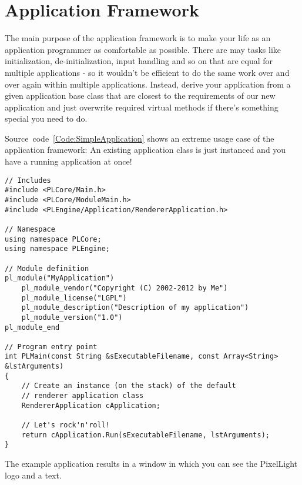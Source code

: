\section{Application Framework}
The main purpose of the application framework is to make your life as an application programmer as comfortable as possible. There are may tasks like initialization, de-initialization, input handling and so on that are equal for multiple applications - so it wouldn't be efficient to do the same work over and over again within multiple applications. Instead, derive your application from a given application base class that are closest to the requirements of our new application and just overwrite required virtual methods if there's something special you need to do.

Source~code~\ref{Code:SimpleApplication} shows an extreme usage case of the application framework: An existing application class is just instanced and you have a running application at once!
\begin{lstlisting}[label=Code:SimpleApplication,caption={Simple application using the application framework}]
// Includes
#include <PLCore/Main.h>
#include <PLCore/ModuleMain.h>
#include <PLEngine/Application/RendererApplication.h>

// Namespace
using namespace PLCore;
using namespace PLEngine;

// Module definition
pl_module("MyApplication")
	pl_module_vendor("Copyright (C) 2002-2012 by Me")
	pl_module_license("LGPL")
	pl_module_description("Description of my application")
	pl_module_version("1.0")
pl_module_end

// Program entry point
int PLMain(const String &sExecutableFilename, const Array<String> &lstArguments)
{
	// Create an instance (on the stack) of the default
	// renderer application class
	RendererApplication cApplication;

	// Let's rock'n'roll!
	return cApplication.Run(sExecutableFilename, lstArguments);
}
\end{lstlisting}
The example application results in a window in which you can see the PixelLight logo and a text.
